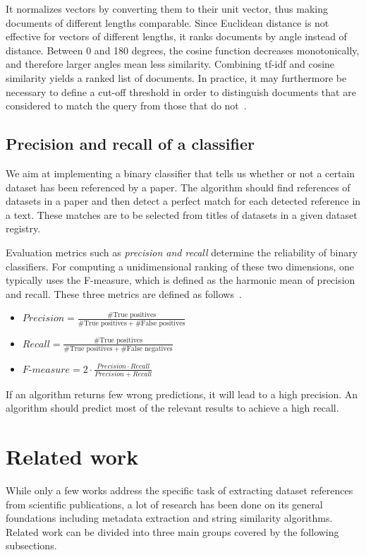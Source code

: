 \documentclass{IOS-Book-Article}
\begin{document}
It normalizes vectors by converting them to their unit vector, thus making documents of different lengths comparable.
Since Euclidean distance is not effective for vectors of different lengths, it ranks documents by angle instead of distance.
Between 0 and 180 degrees, the cosine function decreases monotonically, and therefore larger angles mean less similarity.
Combining tf-idf and cosine similarity yields a ranked list of documents.
In practice, it may furthermore be necessary to define a cut-off threshold in order to distinguish documents that are considered to match the query from those that do not~\citep{Joachims1997}.

\subsection{Precision and recall of a classifier}
\label{sec:precision-recall}
We aim at implementing a binary classifier that tells us whether or not a certain dataset has been referenced by a paper.
The algorithm should find references of datasets in a paper and then detect a perfect match for each detected reference in a text.
These matches are to be selected from titles of datasets in a given dataset registry.

Evaluation metrics such as \emph{precision and recall} determine the reliability of binary classifiers.
For computing a unidimensional ranking of these two dimensions, one typically uses the F-measure, which is defined as the harmonic mean of precision and recall. 
These three metrics are defined as follows~\cite{Powers2011}. 
\begin{itemize}
	\item $\mathit{Precision}=\frac{\#\text{True\ positives}}{\#\text{True positives}+\#\text{False positives}}$
	\item $\mathit{Recall}=\frac{\#\text{True positives}}{\#\text{True positives}+\#\text{False negatives}}$
	\item $\textit{F-measure}=2\cdot{\frac{\mathit{Precision}\cdot\mathit{Recall}}{\mathit{Precision}+\mathit{Recall}}}$
\end{itemize}

If an algorithm returns few wrong predictions, it will lead to a high precision.
An algorithm should predict most of the relevant results to achieve a high recall.

\section{Related work}
\label{sec:relWork}
While only a few works address the specific task of extracting dataset references from scientific publications, a lot of research has been done on its general foundations including metadata extraction and string similarity algorithms. 
Related work can be divided into three main groups covered by the following subsections.
\end{document}
